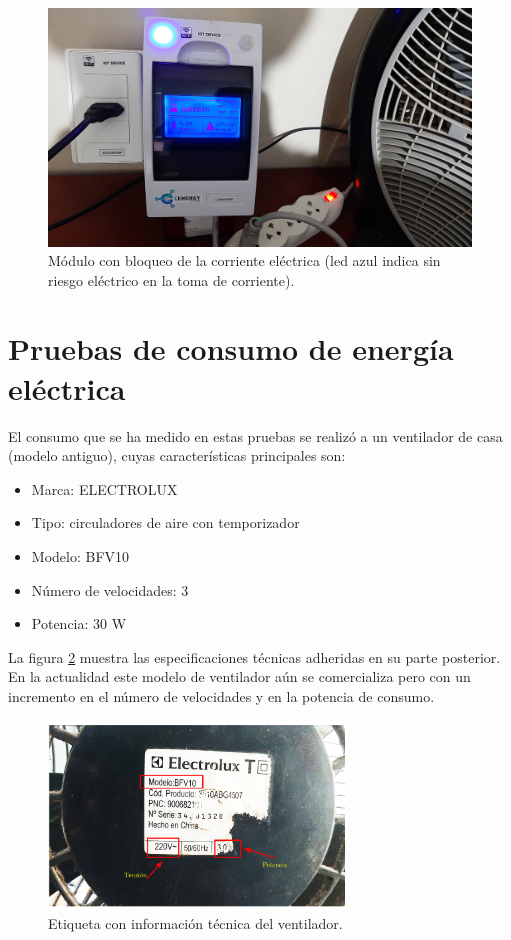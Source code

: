 \vspace{0.5cm}
\begin{figure}[htpb]
\centering 
\includegraphics[width=1.0\textwidth]{./Figures/test/consumo/bloqueo.png}
\caption{Módulo con bloqueo de la corriente eléctrica (led azul indica sin riesgo eléctrico en la toma de corriente).}
\label{fig:test-activa2}
\end{figure}

\vspace{0.5cm}
\section{Pruebas de consumo de energía eléctrica}

El consumo que se ha medido en estas pruebas se realizó a un ventilador de casa (modelo antiguo), cuyas características principales son:

\begin{itemize}
\item Marca: ELECTROLUX
\item Tipo:	circuladores de aire con temporizador
\item Modelo: BFV10
\item Número de velocidades: 3
\item Potencia: 30 W
\end{itemize}

La figura \ref{fig:ventilador}  muestra las especificaciones técnicas adheridas en su parte posterior. En la actualidad este modelo de ventilador aún se comercializa pero con un incremento en el número de velocidades y en la potencia de consumo. 

\begin{figure}[htpb]
\centering 
\includegraphics[width=0.7\textwidth]{./Figures/test/consumo/ventilador.png}
\caption{Etiqueta con información técnica del ventilador.}
\label{fig:ventilador}
\end{figure}

